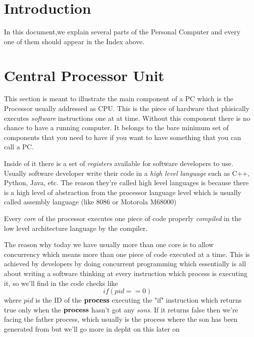 \documentclass[a4paper,12pt]{article}
\begin{document}
\tableofcontents

\section{Introduction}
In this document,we explain several parts  of the Personal Computer
and every one of them should appear in the Index above.

\clearpage

\section{Central Processor Unit}
This section is meant to illustrate the main component of a PC 
which is the Processor usually addressed as CPU.
This is the piece of hardware that phisically executes \emph{software} instructions one at at time.
Without this component there is no chance to have a running computer. It belongs to the bare minimum set of 
components that you need to have if you want to have something that you can call a PC.

Inside of it there is a set of \emph{registers} available for software developers to use.
Usually software developer write their code in a \emph{high level language} such as C++, Python, Java, etc.
The reason they're called high level languages is because there is a high level of abstraction from the processor
language level which is usually called assembly language (like 8086 or Motorola M68000)

Every \emph{core} of the processor executes one piece of code properly \emph {compiled} in the low level architecture
language by the compiler.

The reason why today we have usually more than one core is to allow concurrency which means more than one piece of
code executed at a time. This is achieved by developers by doing concurrent programming which essentially is all about
writing a software thinking at every instruction which process is executing it, so we'll find in the code checks like
\[if (pid==0)\]
where $pid$ is the ID of the $\bf process$ executing the "if" instruction which returns true only when the $\bf process$ hasn't  got any \emph{sons}. If it returns false then we're facing the father process, which usually is the process where the son has been generated from but
we'll go more in depht on this later on

\end{document}
